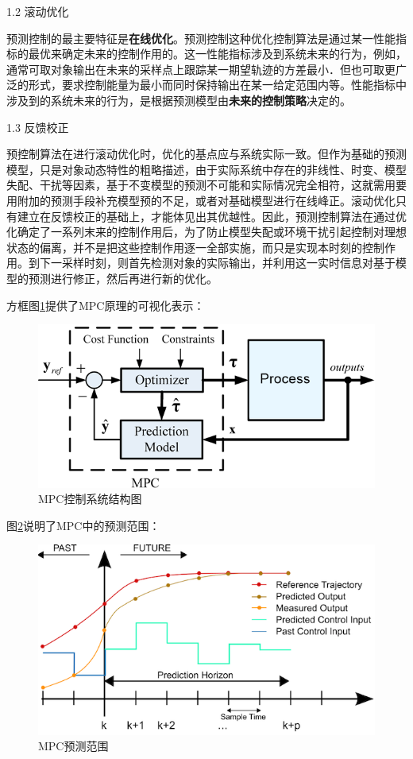 1.2 滚动优化

预测控制的最主要特征是\textbf{在线优化}。预测控制这种优化控制算法是通过某一性能指标的最优来确定未来的控制作用的。这一性能指标涉及到系统未来的行为，例如，通常可取对象输出在未来的采样点上跟踪某一期望轨迹的方差最小．但也可取更广泛的形式，要求控制能量为最小而同时保持输出在某一给定范围内等。性能指标中涉及到的系统未来的行为，是根据预测模型由\textbf{未来的控制策略}决定的\cite{ArtE8}。

1.3 反馈校正

预控制算法在进行滚动优化时，优化的基点应与系统实际一致。但作为基础的预测模型，只是对象动态特性的粗略描述，由于实际系统中存在的非线性、时变、模型失配、干扰等因素，基于不变模型的预测不可能和实际情况完全相符，这就需用要用附加的预测手段补充模型预的不足，或者对基础模型进行在线峰正\cite{Art4}。滚动优化只有建立在反馈校正的基础上，才能体见出其优越性。因此，预测控制算法在通过优化确定了一系列末来的控制作用后，为了防止模型失配或环境干扰引起控制对理想状态的偏离，并不是把这些控制作用逐一全部实施，而只是实现本时刻的控制作用\cite{Art5}。到下一采样时刻，则首先检测对象的实际输出，并利用这一实时信息对基于模型的预测进行修正，然后再进行新的优化\cite{ArtE6}。

方框图\ref{Fig:img5}提供了MPC原理的可视化表示：

\begin{figure}[ht]
  \centering
  \includegraphics[width=0.8\linewidth]{./Figure/MPC_Control_Loop.png}
  \caption{MPC控制系统结构图}\label{Fig:img5}
\end{figure}

图\ref{Fig:img6}说明了MPC中的预测范围：

\begin{figure}[ht]
  \centering
  \includegraphics[width=0.8\linewidth]{./Figure/MPC-Prediction.png}
  \caption{MPC预测范围}\label{Fig:img6}
\end{figure}

